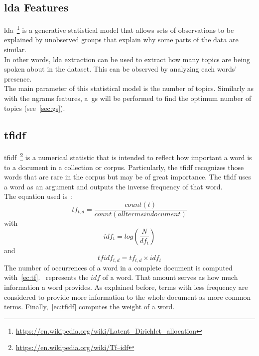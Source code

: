 \subsection{\acf{lda} Features}
\ac{lda}~\footnote{\url{https://en.wikipedia.org/wiki/Latent_Dirichlet_allocation}} is a generative statistical model that allows sets of observations to be explained by unobserved groups that explain why some parts of the data are similar.\\ In other words, \ac{lda} extraction can be used to extract how many topics are being spoken about in the dataset. This can be observed by analyzing each words' presence.\\
The main parameter of this statistical model is the number of topics. Similarly as with the ngrams features, a~\ac{gs} will be performed to find the optimum number of topics (see~\cref{sec:gs}).
\subsection{\acf{tfidf}}
\label{sec:tfidf}
\ac{tfidf}~\footnote{\url{https://en.wikipedia.org/wiki/Tf–idf}} is a numerical statistic that is intended to reflect how important a word is to a document in a collection or corpus. Particularly, the \ac{tfidf} recognizes those words that are rare in the corpus but may be of great importance. The \ac{tfidf} uses a word as an argument and outputs the inverse frequency of that word.\\
The equation used is~\cite{tfidf}:
\begin{equation}
\label{ec:tf}
tf_{t,d} = \frac{count(t)}{count(alltermsindocument)}
\end{equation}
with
\begin{equation}
\label{ec:idf}
idf_t=log(\frac{N}{df_t})
\end{equation}
and
\begin{equation}
\label{ec:tfidf}
tfidf_{t,d}=tf_{t,d}\times idf_t
\end{equation}
The number of occurrences of a word in a complete document is computed with~\cref{ec:tf}.~ represents the $idf$ of a word. That amount serves as how much information a word provides. As explained before, terms with less frequency are considered to provide more information to the whole document as more common terms. Finally,~\cref{ec:tfidf} computes the weight of a word.
